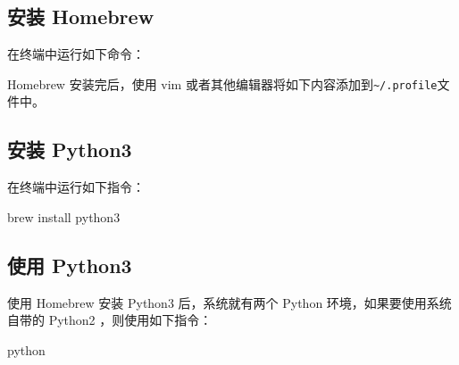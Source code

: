 \documentclass[]{ctexbook}
\newenvironment{Shaded}{\begin{snugshade}}{\end{snugshade}}
\newcommand{\BuiltInTok}[1]{#1}
\newcommand{\ExtensionTok}[1]{#1}
\newcommand{\NormalTok}[1]{#1}
\newcommand{\StringTok}[1]{\textcolor[rgb]{0.31,0.60,0.02}{#1}}
\newcommand{\VariableTok}[1]{\textcolor[rgb]{0.00,0.00,0.00}{#1}}
\begin{document}
\hypertarget{ux5b89ux88c5-homebrew}{%
\subsection{安装 Homebrew}\label{ux5b89ux88c5-homebrew}}

在终端中运行如下命令：

\begin{Shaded}
\end{Shaded}

Homebrew 安装完后，使用 vim 或者其他编辑器将如下内容添加到\texttt{\textasciitilde{}/.profile}文件中。

\begin{Shaded}
\end{Shaded}

\hypertarget{ux5b89ux88c5-python3}{%
\subsection{安装 Python3}\label{ux5b89ux88c5-python3}}

在终端中运行如下指令：

\begin{Shaded}
\begin{Highlighting}[]
\ExtensionTok{brew}\NormalTok{ install python3}
\end{Highlighting}
\end{Shaded}

\hypertarget{ux4f7fux7528-python3}{%
\subsection{使用 Python3}\label{ux4f7fux7528-python3}}

使用 Homebrew 安装 Python3 后，系统就有两个 Python 环境，如果要使用系统自带的 Python2
，则使用如下指令：

\begin{Shaded}
\begin{Highlighting}[]
\ExtensionTok{python}
\end{Highlighting}
\end{Shaded}
\end{document}
